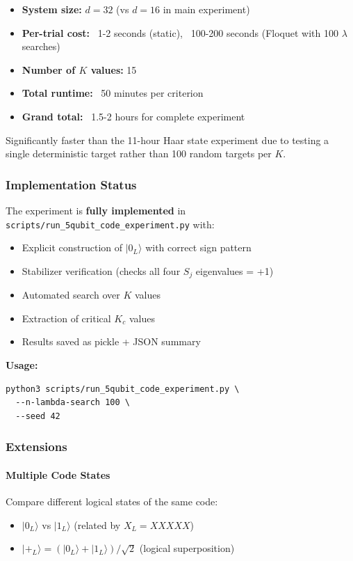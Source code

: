 \begin{itemize}
\item \textbf{System size:} $d=32$ (vs $d=16$ in main experiment)
\item \textbf{Per-trial cost:} ~1-2 seconds (static), ~100-200 seconds (Floquet with 100 $\lambda$ searches)
\item \textbf{Number of $K$ values:} 15
\item \textbf{Total runtime:} ~50 minutes per criterion
\item \textbf{Grand total:} ~1.5-2 hours for complete experiment
\end{itemize}

Significantly faster than the 11-hour Haar state experiment due to testing a single deterministic target rather than 100 random targets per $K$.

\subsubsection{Implementation Status}

The experiment is \textbf{fully implemented} in \texttt{scripts/run\_5qubit\_code\_experiment.py} with:
\begin{itemize}
\item Explicit construction of $|0_L\rangle$ with correct sign pattern
\item Stabilizer verification (checks all four $S_j$ eigenvalues = +1)
\item Automated search over $K$ values
\item Extraction of critical $K_c$ values
\item Results saved as pickle + JSON summary
\end{itemize}

\textbf{Usage:}
\begin{verbatim}
python3 scripts/run_5qubit_code_experiment.py \
  --n-lambda-search 100 \
  --seed 42
\end{verbatim}

\subsubsection{Extensions}

\paragraph{Multiple Code States}

Compare different logical states of the same code:
\begin{itemize}
\item $|0_L\rangle$ vs $|1_L\rangle$ (related by $X_L = XXXXX$)
\item $|+_L\rangle = (|0_L\rangle + |1_L\rangle)/\sqrt{2}$ (logical superposition)
\end{itemize}

